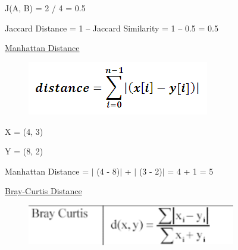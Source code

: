 \documentclass[12pt]{article}
\renewcommand{\_}{\kern-1.5pt\textunderscore\kern-1.5pt}
\begin{document}
{\fontsize{14pt}{16.8pt}\selectfont J(A, B) = 2 / 4 = 0.5\par}\par

{\fontsize{14pt}{16.8pt}\selectfont Jaccard Distance = 1 – Jaccard Similarity = 1 – 0.5 = 0.5\par}\par

{\fontsize{14pt}{16.8pt}\selectfont \uline{Manhattan Distance}\par}\par




\begin{figure}[H]
	\begin{Center}
		\includegraphics[width=3.13in,height=0.92in]{./media/image10.png}
	\end{Center}
\end{figure}



\par

{\fontsize{14pt}{16.8pt}\selectfont X = (4, 3)\par}\par

{\fontsize{14pt}{16.8pt}\selectfont Y = (8, 2)\par}\par

{\fontsize{14pt}{16.8pt}\selectfont Manhattan Distance = $ \vert $ (4 - 8)$ \vert $  + $ \vert $ (3 - 2)$ \vert $  = 4 + 1 = 5\par}\par

{\fontsize{14pt}{16.8pt}\selectfont \uline{Bray-Curtis Distance}\par}\par




\begin{figure}[H]
	\begin{Center}
		\includegraphics[width=3.58in,height=0.7in]{./media/image11.png}
	\end{Center}
\end{figure}
\end{document}
